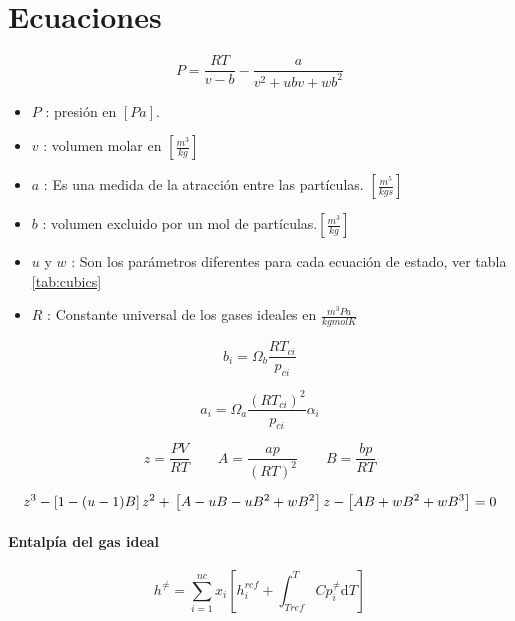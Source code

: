 \chapter{Ecuaciones}



\begin{equation}
P = \frac{R T}{v-b} - \frac{a}{v^2 +u b v + w b^2 }
\end{equation}


\begin{itemize}\itemsep0ex
\item $P$ : presión en $[Pa]$.
\item $v$ : volumen molar en $[\frac{m^3}{kg}]$
\item $a$ : Es una medida de la atracción entre las partículas. $[\frac{m^5}{kg s}]$
\item $b$ : volumen excluido por un mol de partículas.$[\frac{m^3}{kg}]$
\item $u$ y $w$ : Son los parámetros diferentes para cada ecuación de estado, ver tabla \ref{tab:cubics}
\item $R$ : Constante universal de los gases ideales en $\frac{m^3 Pa}{kgmol K}$
\end{itemize}


\begin{equation}\label{eq:a}
	b_i = \Omega_b \frac{R T_{ci}}{p_{ci}} 
\end{equation}

\begin{equation}\label{eq:b}
 a_i = \Omega_a \frac{\left(R T_{ci}\right)^2}{p_{ci}} \alpha_i
\end{equation}




\begin{equation}
z= \frac{P V}{R T}
\qquad
A=\frac{ap}{(RT)^2}
\qquad
B=\frac{bp}{RT}
\end{equation}

\begin{equation}
z^3-\left[1-(u-1)B\right]z^2+ \\ \left[A-uB-uB^2 +\\ wB^2\right]z-\left[AB+wB^2+wB^3\right]=0
\end{equation}


\subsubsection{Entalpía del gas ideal}
\begin{equation}\label{eq:idealgasenthalpy}
h^{\neq} = \sum_{i=1}^{nc} x_i \left[ h_i^{ref} + \int_{Tref}^{T} Cp_i^{\neq} \mathrm{d}T \right]
\end{equation}

